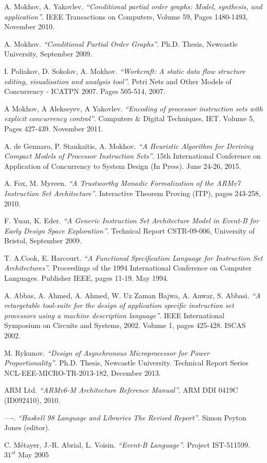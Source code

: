 \documentclass[conference]{IEEEtran}
\begin{document}
\begin{thebibliography}{1}

	A. Mokhov, A. Yakovlev. \emph{``Conditional partial order graphs: Model,
	synthesis, and application''}. IEEE Transactions on Computers, Volume 59,
	Pages 1480-1493, November 2010.
	
	A. Mokhov. \emph{``Conditional Partial Order Graphs''}. Ph.D. Thesis,
	Newcastle University, September 2009.	

	I. Poliakov, D. Sokolov, A. Mokhov. \emph{``Workcraft: A static data flow
	structure editing, visualisation and analysis tool''}. Petri Nets and Other
	Models of Concurrency - ICATPN 2007. Pages 505-514, 2007.
	
	A Mokhov, A Alekseyev, A Yakovlev. \emph{``Encoding of processor instruction
	sets with explicit concurrency control''}. Computers \& Digital Techniques,
	IET. Volume 5, Pages 427-439. November 2011.
	
	A. de Gennaro, P. Stankaitis, A. Mokhov. \emph{``A Heuristic Algorithm for
	Deriving Compact Models of Processor Instruction Sets''}. 15th International
	Conference on Application of Concurrency to System Design (In Press). June
	24-26, 2015.

	A. Fox, M. Myreen. \emph{``A Trustworthy Monadic Formalization of the ARMv7
	Instruction Set Architecture''}. Interactive Theorem Proving (ITP), pages
	243-258, 2010.	
	
	F. Yuan, K. Eder. \emph{``A Generic Instruction Set Architecture Model in
	Event-B for Early Design Space Exploration''}. Technical Report CSTR-09-006,
	University of Bristol, September 2009.

	T. A.Cook, E. Harcourt. \emph{``A Functional Specification Language for
	Instruction Set Architectures''}. Proceedings of the 1994 International
	Conference on Computer Languages. Publisher IEEE, pages 11-19. May 1994.
	
	A. Abbas, A. Ahmed, A. Ahmed, W. Uz Zaman Bajwa, A. Anwar, S. Abbasi. 
	\emph{``A retargetable tool-suite for the design of application specific
	instruction set processors using a machine description language''}. IEEE
	International Symposium on Circuits and Systems, 2002. Volume 1, pages 425-428.
	ISCAS 2002.
	
	M. Rykunov. \emph{``Design of Asynchronous Microprocessor for Power
	Proportionality''}. Ph.D. Thesis, Newcastle University. Technical Report Series
	NCL-EEE-MICRO-TR-2013-182, December 2013.
	
	ARM Ltd. \emph{``ARMv6-M Architecture Reference Manual''}. 
	ARM DDI 0419C (ID092410), 2010.
	
	----. \emph{``Haskell 98 Language and Libraries The Revised Report''}. 
	Simon Peyton Jones (editor).
	
	C. Métayer, J.-R. Abrial, L. Voisin. \emph{``Event-B Language''}. 
	Project IST-511599. $31^{st}$ May 2005
	
\end{thebibliography}
\end{document}
